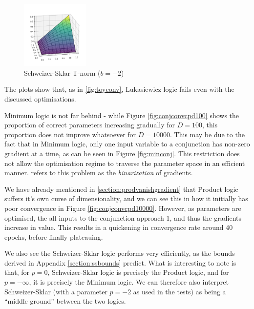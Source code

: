 \begin{figure}
    \centering
    \vspace{-35.0pt}
    \includegraphics[width=0.30\textwidth, height=0.30\textwidth]{imgs/fuzzy_ss-2_and.png}
    \vspace{-10.0pt}
    \caption[width=0.3\textwidth]{Schweizer-Sklar T-norm ($b=-2$)}
    \label{fig:ssand}
\end{figure}

The plots show that, as in \ref{fig:toyconv}, Lukasiewicz logic fails even with the discussed optimisations. 

Minimum logic is not far behind - while Figure \ref{fig:conjconvcpd100} shows the proportion of correct parameters increasing gradually for $D=100$, this proportion does not improve whatsoever for $D=10000$. This may be due to the fact that in Minimum logic, only one input variable to a conjunction has non-zero gradient at a time, as can be seen in Figure \ref{fig:minconj}. This restriction does not allow the optimisation regime to traverse the parameter space in an efficient manner. \cite{analyzefuzzy} refers to this problem as the \textit{binarization} of gradients.

We have already mentioned in \ref{section:prodvanishgradient} that Product logic suffers it's own curse of dimensionality, and we can see this in how it initially has poor convergence in Figure \ref{fig:conjconvcpd10000}. However, as parameters are optimised, the all inputs to the conjunction approach 1, and thus the gradients increase in value. This results in a quickening in convergence rate around 40 epochs, before finally plateauing.

We also see the Schweizer-Sklar logic performs very efficiently, as the bounds derived in Appendix \ref{section:ssbounds} predict. What is interesting to note is that, for $p=0$, Schweizer-Sklar logic is precisely the Product logic, and for $p=-\infty$, it is precisely the Minimum logic. We can therefore also interpret Schweizer-Sklar (with a parameter $p=-2$ as used in the tests) as being a ``middle ground'' between the two logics. 

